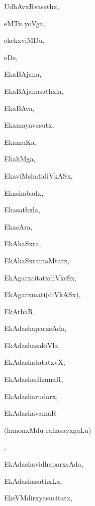 \begin{multicols}{3}
{\noindent
{UdhAvxRvasethx}, \pageref{UdhAvxRvasethx}

\noindent
{eMTu yoVga}, \pageref{eMTu yoVga}

\noindent
{ekekxviMDu}, \pageref{ekekxviMDu}

\noindent
{eDe}, \pageref{eDe}

\noindent
{EkaBAjana}, \pageref{EkaBAjana}

\noindent
{EkaBAjanasathxla}, \pageref{EkaBAjanasathxla}

\noindent
{EkaBAva}, \pageref{EkaBAva}

\noindent
{Ekamayavasutx}, \pageref{Ekamayavasutx}

\noindent
{EkamuKa}, \pageref{EkamuKa}

\noindent
{EkaliMga}, \pageref{EkaliMga}

\noindent
{EkaviMshatidiVkASx}, \pageref{EkaviMshatidiVkASx}

\noindent
{Ekashabadx}, \pageref{Ekashabadx}

\noindent
{Ekasathxla}, \pageref{Ekasathxla}

\noindent
{EkasAra}, \pageref{EkasAra}

\noindent
{EkAkaSxra}, \pageref{EkAkaSxra}

\noindent
{EkAkaSxramaMtarx}, \pageref{EkAkaSxramaMtarx}

\noindent
{EkAgarxcitatxdiVkeSx}, \pageref{EkAgarxcitatxdiVkeSx}

\noindent
{EkAgarxmati(diVkASx)}, \pageref{EkAgarxmati(diVkASx)}

\noindent
{EkAthaR}, \pageref{EkAthaR}

\noindent
{EkAdashaparxsAda}, \pageref{EkAdashaparxsAda}

\noindent
{EkAdashasakiVla}, \pageref{EkAdashasakiVla}

\noindent
{EkAdashatatatxvX}, \pageref{EkAdashatatatxvX}

\noindent
{EkAdashadhamaR}, \pageref{EkAdashadhamaR}

\noindent
{EkAdasharudarx}, \pageref{EkAdasharudarx}

\noindent
{EkAdashavamaR 

\noindent
\qquad (hanonxMdu rahasayxgaLu)}, \pageref{EkAdashavamaR (hanonxMdu rahasayxgaLu)}

\noindent
{EkAdashavidhaparxsAda}, \pageref{EkAdashavidhaparxsAda}

\noindent
{EkAdashasathxLa}, \pageref{EkAdashasathxLa}

\noindent
{EkeVMdirxyasucitatx}, \pageref{EkeVMdirxyasucitatx}

}
\end{multicols}
